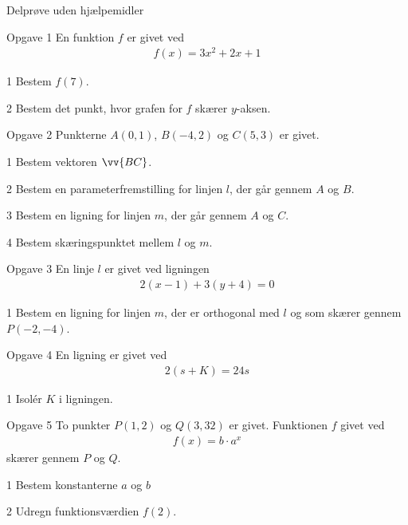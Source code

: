 \begin{center}
\LARGE
Delprøve uden hjælpemidler 
\end{center}

\begin{opgavetekst}{Opgave 1}
	En funktion $f$ er givet ved 
	\begin{align*}
		f(x) = 3x^2+2x+1
	\end{align*}
\end{opgavetekst}
	\begin{delopgave}{}{1}
		Bestem $f(7)$.
	\end{delopgave}
	\begin{delopgave}{}{2}
		Bestem det punkt, hvor grafen for $f$ skærer $y$-aksen.
	\end{delopgave}
\begin{opgavetekst}{Opgave 2}
	Punkterne $A(0,1)$, $B(-4,2)$ og  $C(5,3)$ er givet. 
\end{opgavetekst}
	\begin{delopgave}{}{1}
		Bestem vektoren $\vv{BC}$.
	\end{delopgave}
	\begin{delopgave}{}{2}
		Bestem en parameterfremstilling for linjen $l$, der går gennem $A$ og $B$.
	\end{delopgave}
	\begin{delopgave}{}{3}
		Bestem en ligning for linjen $m$, der går gennem $A$ og $C$. 
	\end{delopgave}
	\begin{delopgave}{}{4}
		Bestem skæringspunktet mellem $l$ og $m$. 
	\end{delopgave}
\begin{opgavetekst}{Opgave 3}
	En linje $l$ er givet ved ligningen 
	\begin{align*}
		2(x-1) + 3(y+4) = 0
	\end{align*}
\end{opgavetekst}
\begin{delopgave}{}{1}
	Bestem en ligning for linjen $m$, der er orthogonal med $l$ og som skærer gennem $P(-2,-4)$.
\end{delopgave}
\begin{opgavetekst}{Opgave 4}
	En ligning er givet ved
	\begin{align*}
		2(s+K) = 24s
	\end{align*}
\end{opgavetekst}
\begin{delopgave}{}{1}
	Isolér $K$ i ligningen. 
\end{delopgave}
\begin{opgavetekst}{Opgave 5}
	To punkter $P(1,2)$ og $Q(3,32)$ er givet. Funktionen $f$ givet ved
	\begin{align*}
		f(x) = b\cdot a^x
	\end{align*}
	skærer gennem $P$ og $Q$.
\end{opgavetekst}
\begin{delopgave}{}{1}
	Bestem konstanterne $a$ og $b$
\end{delopgave}
\begin{delopgave}{}{2}
	Udregn funktionsværdien $f(2)$. 
\end{delopgave}

